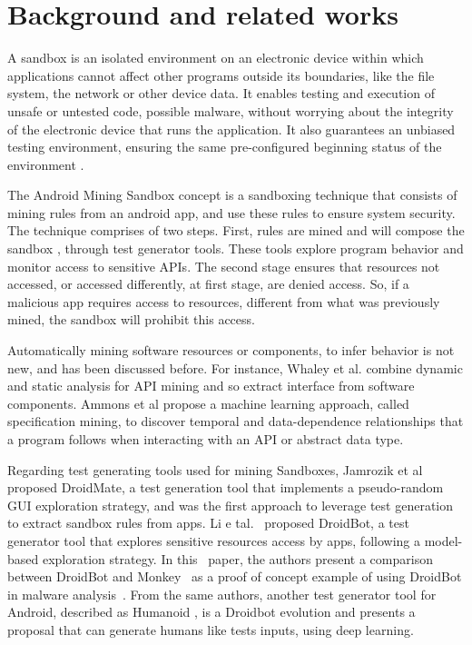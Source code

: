 \section{Background and related works}

A sandbox is an isolated environment on an electronic device within which applications cannot affect other programs outside its boundaries, like the file system, the network or other device data. It enables testing and execution of unsafe or untested code, possible malware, without worrying about the integrity of the electronic device that runs the application. It also guarantees an unbiased testing environment, ensuring the same pre-configured beginning status of the environment .

The Android Mining Sandbox concept is a sandboxing technique that consists of mining rules from an android app, and use these rules to ensure system security. The technique comprises of two steps. First, rules are mined and will compose the sandbox , through test generator tools. These tools explore program behavior and monitor access to sensitive APIs. The second stage ensures that resources not accessed, or accessed differently, at first stage, are denied access. So, if a malicious app requires access to resources, different from what was previously mined, the sandbox will prohibit this access.

Automatically mining software resources or components, to infer behavior is not new, and has been discussed before. For instance, Whaley et al. \cite{DBLP:conf/issta/WhaleyML02} combine dynamic and static analysis for API mining and so extract interface from software components. Ammons et al \cite{DBLP:conf/popl/AmmonsBL02} propose a machine learning
approach, called specification mining, to discover temporal and data-dependence relationships that a program follows when interacting with an API or abstract data type.

Regarding test generating tools used for mining Sandboxes, Jamrozik et al \cite{DBLP:conf/icse/JamrozikZ16} proposed DroidMate, a test generation tool that implements a pseudo-random GUI exploration strategy, and was the first approach to leverage test generation to extract sandbox rules from apps. Li e tal.~\cite{DBLP:conf/icse/LiYGC17} proposed DroidBot, a test generator tool that explores sensitive resources access by apps, following a model-based exploration strategy. In this~ paper, the authors present a comparison between DroidBot and Monkey~\cite{Monkey} as a proof of concept example of using DroidBot in malware analysis~. From the same authors, another test generator tool for Android, described as Humanoid \cite{DBLP:conf/kbse/LiY0C19}, is a Droidbot evolution and presents a proposal that can generate humans like tests inputs, using deep learning.

